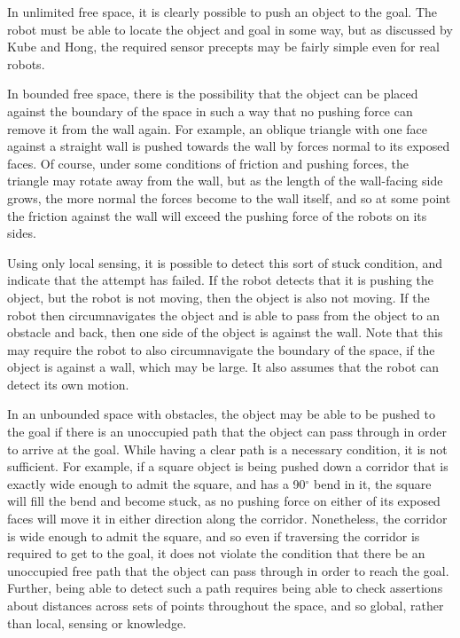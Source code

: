 In unlimited free space, it is clearly possible to push an object to the goal.
The robot must be able to locate the object and goal in some way, but as discussed by Kube and Hong, the required sensor precepts may be fairly simple even for real robots. 

In bounded free space, there is the possibility that the object can be placed against the boundary of the space in such a way that no pushing force can remove it from the wall again. 
For example, an oblique triangle with one face against a straight wall is pushed towards the wall by forces normal to its exposed faces. 
Of course, under some conditions of friction and pushing forces, the triangle may rotate away from the wall, but as the length of the wall-facing side grows, the more normal the forces become to the wall itself, and so at some point the friction against the wall will exceed the pushing force of the robots on its sides. 

Using only local sensing, it is possible to detect this sort of stuck condition, and indicate that the attempt has failed. 
If the robot detects that it is pushing the object, but the robot is not moving, then the object is also not moving. 
If the robot then circumnavigates the object and is able to pass from the object to an obstacle and back, then one side of the object is against the wall. 
Note that this may require the robot to also circumnavigate the boundary of the space, if the object is against a wall, which may be large. 
It also assumes that the robot can detect its own motion. 

In an unbounded space with obstacles, the object may be able to be pushed to the goal if there is an unoccupied path that the object can pass through in order to arrive at the goal. 
While having a clear path is a necessary condition, it is not sufficient. 
For example, if a square object is being pushed down a corridor that is exactly wide enough to admit the square, and has a 90$^{\circ}$ bend in it, the square will fill the bend and become stuck, as no pushing force on either of its exposed faces will move it in either direction along the corridor. 
Nonetheless, the corridor is wide enough to admit the square, and so even if traversing the corridor is required to get to the goal, it does not violate the condition that there be an unoccupied free path that the object can pass through in order to reach the goal. 
Further, being able to detect such a path requires being able to check assertions about distances across sets of points throughout the space, and so global, rather than local, sensing or knowledge. 

